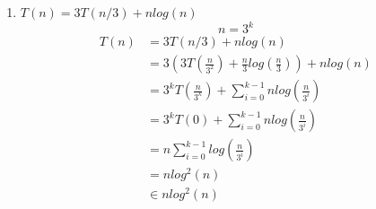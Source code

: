 \documentclass{article}
\begin{document}
\begin{enumerate}
\begin{enumerate}
        \item $T(n) = 3T(n/3) + n log(n)$
        \begin{equation*}
            n = 3^k
        \end{equation*}
        \begin{align*}
            T(n) &= 3T(n/3) + n log(n)\\
            &= 3(3T(\frac{n}{3^2}) + \frac{n}{3} log(\frac{n}{3})) + n log(n)\\
            &= 3^k T(\frac{n}{3^k}) + \sum_{i =0 }^{k-1} n log(\frac{n}{3^i})\\
            &= 3^k T(0) + \sum_{i =0 }^{k-1}n log(\frac{n}{3^i})\\
            &= n \sum_{i =0 }^{k-1} log(\frac{n}{3^i})\\
            &= n log^2(n) \\
            &\in n log^2(n)
        \end{align*}


\end{enumerate}
\end{enumerate}
\end{document}
